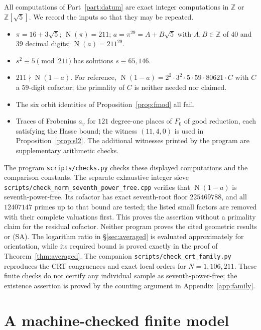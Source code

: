\documentclass[11pt]{article}
\theoremstyle{plain}
\theoremstyle{definition}
\newcommand{\SA}{\textup{(SA)}}
\newcommand{\Norm}{\operatorname{N}}
\begin{document}
All computations of Part~\ref{part:datum} are exact integer computations in
$\mathbb{Z}$ or $\mathbb{Z}[\sqrt5]$.  We record the inputs so that they may be
repeated.
\begin{itemize}
\item $\pi=16+3\sqrt5$; $\Norm(\pi)=211$; $a=\pi^{29}=A+B\sqrt5$ with
  $A,B\in\mathbb{Z}$ of $40$ and $39$ decimal digits; $\Norm(a)=211^{29}$.
\item $s^2\equiv5\pmod{211}$ has solutions $s\equiv65,146$.
\item $211\nmid\Norm(1-a)$.  For reference,
  $\Norm(1-a)=2^2\cdot3^2\cdot5\cdot59\cdot80621\cdot C$ with
  $C$ a $59$-digit cofactor; the primality of $C$ is neither needed nor claimed.
\item The six orbit identities of Proposition~\ref{prop:fmod} all fail.
\item Traces of Frobenius $a_v$ for $121$ degree-one places of $F_0$ of good
  reduction, each satisfying the Hasse bound; the witness $(11,4,0)$ is used in
  Proposition~\ref{prop:sl2}.  The additional witnesses printed by the program
  are supplementary arithmetic checks.
\end{itemize}
The program \texttt{scripts/checks.py} checks these displayed computations
and the comparison constants.  The separate exhaustive integer sieve
\texttt{scripts/check\_norm\_seventh\_power\_free.cpp} verifies that
$\Norm(1-a)$ is seventh-power-free.  Its cofactor has exact seventh-root floor
$225469788$, and all $12407147$ primes up to that bound are tested; the listed
small factors are removed with their complete valuations first.  This proves
the assertion without a primality claim for the residual cofactor.
Neither program proves the cited geometric results or \SA{}.
The logarithm ratio in \S\ref{sec:averaged} is evaluated approximately for
orientation, while its required bound is proved exactly in the proof of
Theorem~\ref{thm:averaged}.
The companion \texttt{scripts/check\_crt\_family.py} reproduces the CRT
congruences and exact local orders for $N=1,106,211$.  These finite checks do
not certify any individual sample as seventh-power-free; the existence
assertion is proved by the counting argument in Appendix~\ref{app:family}.

\section{A machine-checked finite model}\label{app:lean}
\end{document}
